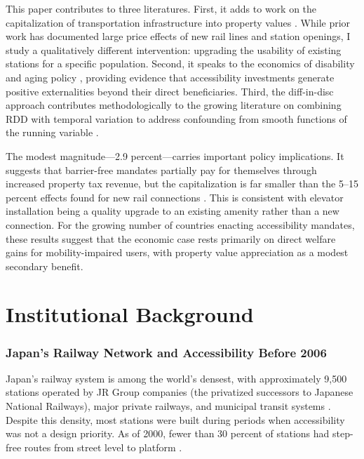 \documentclass[12pt]{article}
\begin{document}
This paper contributes to three literatures. First, it adds to work on the capitalization of transportation infrastructure into property values \citep{gibbons2005valuing, ahlfeldt2015economics, tsivanidis2023evaluating}. While prior work has documented large price effects of new rail lines and station openings, I study a qualitatively different intervention: upgrading the usability of existing stations for a specific population. Second, it speaks to the economics of disability and aging policy \citep{acemoglu2001consequences, jones2022disability}, providing evidence that accessibility investments generate positive externalities beyond their direct beneficiaries. Third, the diff-in-disc approach contributes methodologically to the growing literature on combining RDD with temporal variation to address confounding from smooth functions of the running variable \citep{grembi2016fiscal, eggers2018regression}.

The modest magnitude---2.9 percent---carries important policy implications. It suggests that barrier-free mandates partially pay for themselves through increased property tax revenue, but the capitalization is far smaller than the 5--15 percent effects found for new rail connections \citep{gibbons2005valuing}. This is consistent with elevator installation being a quality upgrade to an existing amenity rather than a new connection. For the growing number of countries enacting accessibility mandates, these results suggest that the economic case rests primarily on direct welfare gains for mobility-impaired users, with property value appreciation as a modest secondary benefit.


\section{Institutional Background}

\subsubsection*{Japan's Railway Network and Accessibility Before 2006}  Japan's railway system is among the world's densest, with approximately 9,500 stations operated by JR Group companies (the privatized successors to Japanese National Railways), major private railways, and municipal transit systems \citep{sorensen2002making}. Despite this density, most stations were built during periods when accessibility was not a design priority. As of 2000, fewer than 30 percent of stations had step-free routes from street level to platform \citep{mlit2020}.
\end{document}
